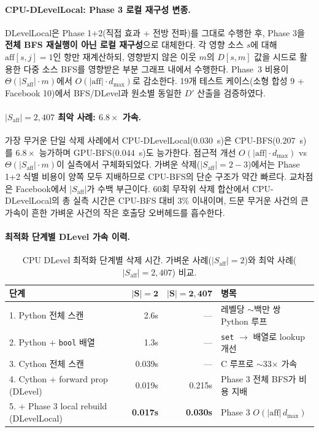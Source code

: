 \documentclass[11pt,a4paper]{article}
\begin{document}
\paragraph{CPU-DLevelLocal: Phase 3 로컬 재구성 변종.}
DLevelLocal은 Phase 1+2(직접 효과 + 전방 전파)를 그대로 수행한 후, Phase 3을 \textbf{전체 BFS 재실행이 아닌 로컬 재구성}으로 대체한다. 각 영향 소스 $s$에 대해 $\mathrm{aff}[s,j]=1$인 항만 재계산하되, 영향받지 않은 이웃 $m$의 $D[s,m]$ 값을 시드로 활용한 다중 소스 BFS를 영향받은 부분 그래프 내에서 수행한다. Phase~3 비용이 $\Theta(|S_{\mathrm{aff}}|\cdot m)$에서 $O(|\mathrm{aff}|\cdot d_{\max})$로 감소한다. 19개 테스트 케이스(소형 합성 9 + Facebook 10)에서 BFS/DLevel과 원소별 동일한 $D'$ 산출을 검증하였다.

\paragraph{$|S_{\text{aff}}|=2{,}407$ 최악 사례: $6.8\times$ 가속.}
가장 무거운 단일 삭제 사례에서 CPU-DLevelLocal($0.030$~s)은 CPU-BFS($0.207$~s)를 $6.8\times$ 능가하며 GPU-BFS($0.044$~s)도 능가한다. 점근적 개선 $O(|\mathrm{aff}|\cdot d_{\max})$ vs $\Theta(|S_{\mathrm{aff}}|\cdot m)$이 실측에서 구체화되었다. 가벼운 삭제($|S_{\text{aff}}|=2{-}3$)에서는 Phase 1+2 식별 비용이 양쪽 모두 지배하므로 CPU-BFS의 단순 구조가 약간 빠르다. 교차점은 Facebook에서 $|S_{\text{aff}}|$가 수백 부근이다. 60회 무작위 삭제 합산에서 CPU-DLevelLocal의 총 실측 시간은 CPU-BFS 대비 $3\%$ 이내이며, 드문 무거운 사건의 큰 가속이 흔한 가벼운 사건의 작은 호출당 오버헤드를 흡수한다.

\paragraph{최적화 단계별 DLevel 가속 이력.}

\begin{table}[H]\centering
\caption{CPU DLevel 최적화 단계별 삭제 시간. 가벼운 사례($|S_{\text{aff}}|=2$)와 최악 사례($|S_{\text{aff}}|=2{,}407$) 비교.}
\small
\begin{tabular}{@{}lrrl@{}}
\toprule
\textbf{단계} & $\boldsymbol{|S|=2}$ & $\boldsymbol{|S|=2{,}407}$ & \textbf{병목} \\
\midrule
1. Python 전체 스캔 & 2.6s & --- & 레벨당 $\sim$백만 쌍 Python 루프 \\
2. Python + \texttt{bool} 배열 & 1.3s & --- & \texttt{set} $\to$ 배열로 lookup 개선 \\
3. Cython 전체 스캔 & 0.039s & --- & C 루프로 $\sim$33$\times$ 가속 \\
4. Cython + forward prop (DLevel) & 0.019s & 0.215s & Phase 3 전체 BFS가 비용 지배 \\
\rowcolor{cpubest!8} 5. + Phase 3 local rebuild (DLevelLocal) & \textbf{0.017s} & \textbf{0.030s} & Phase 3 $O(|\mathrm{aff}|\,d_{\max})$ \\
\bottomrule
\end{tabular}
\end{table}
\end{document}
